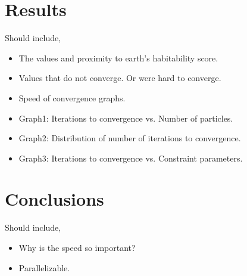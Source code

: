 \documentclass[10pt,a4paper]{article}
\newenvironment{pointers}{%
  \noindent Should include,
  \begin{itemize}
    \setlength{\itemsep}{-1pt}}{%
\end{itemize}}
\begin{document}
\section{Results}
\begin{pointers}
\item The values and proximity to earth's habitability score.
\item Values that do not converge. Or were hard to converge.
\item Speed of convergence graphs.
\item Graph1: Iterations to convergence vs. Number of particles.
\item Graph2: Distribution of number of iterations to convergence.
\item Graph3: Iterations to convergence vs. Constraint parameters.
\end{pointers}


\section{Conclusions}
\begin{pointers}
\item Why is the speed so important?
\item Parallelizable.
\end{pointers}
\end{document}
